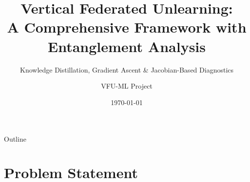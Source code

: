 \documentclass[aspectratio=169, 11pt]{beamer}
\title[VFL Unlearning Framework]{Vertical Federated Unlearning:\\A Comprehensive Framework with Entanglement Analysis}
\subtitle{Knowledge Distillation, Gradient Ascent \& Jacobian-Based Diagnostics}
\author{VFU-ML Project}
\date{\today}
\institute{CSE 472 --- Machine Learning}
\begin{document}
\begin{frame}
  \titlepage
\end{frame}

\begin{frame}{Outline}
  \tableofcontents
\end{frame}

\section{Problem Statement}
\end{document}
